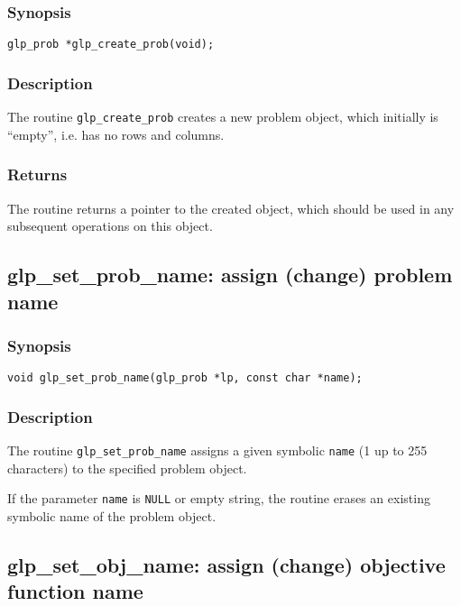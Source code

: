 \subsubsection*{Synopsis}

\begin{verbatim}
glp_prob *glp_create_prob(void);
\end{verbatim}

\subsubsection*{Description}

The routine \verb|glp_create_prob| creates a new problem object, which
initially is ``empty'', i.e. has no rows and columns.

\subsubsection*{Returns}

The routine returns a pointer to the created object, which should be
used in any subsequent operations on this object.

\subsection{glp\_set\_prob\_name: assign (change) problem name}

\subsubsection*{Synopsis}

\begin{verbatim}
void glp_set_prob_name(glp_prob *lp, const char *name);
\end{verbatim}

\subsubsection*{Description}

The routine \verb|glp_set_prob_name| assigns a given symbolic
\verb|name| (1 up to 255 characters) to the specified problem object.

If the parameter \verb|name| is \verb|NULL| or empty string, the routine
erases an existing symbolic name of the problem object.

\subsection{glp\_set\_obj\_name: assign (change) objective function
name}

